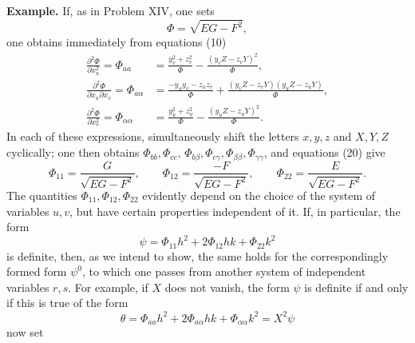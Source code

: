 \documentclass[11pt,a4paper,leqno]{article}
\begin{document}
\textbf{Example.} If, as in Problem XIV, one sets
\[
\Phi=\sqrt{EG-F^2},
\]
one obtains immediately from equations (10)
\[
\begin{aligned}
\frac{\partial^2\Phi}{\partial x_u^2}=\Phi_{aa}
&=\frac{y_v^2+z_v^2}{\Phi}
-\frac{(y_vZ-z_vY)^2}{\Phi},\\
\frac{\partial^2\Phi}{\partial x_u\partial x_v}=\Phi_{a\alpha}
&=\frac{-y_uy_v-z_uz_v}{\Phi}
+\frac{(y_vZ-z_vY)(y_uZ-z_uY)}{\Phi},\\
\frac{\partial^2\Phi}{\partial x_v^2}=\Phi_{\alpha\alpha}
&=\frac{y_u^2+z_u^2}{\Phi}
-\frac{(y_uZ-z_uY)^2}{\Phi}.
\end{aligned}
\]
In each of these expressions, simultaneously shift the letters $x,y,z$
and $X,Y,Z$ cyclically; one then obtains $\Phi_{bb},\Phi_{cc}$,
$\Phi_{b\beta},\Phi_{c\gamma},\Phi_{\beta\beta},\Phi_{\gamma\gamma}$, and equations (20) give
\[
\Phi_{11}=\frac{G}{\sqrt{EG-F^2}},\qquad
\Phi_{12}=\frac{-F}{\sqrt{EG-F^2}},\qquad
\Phi_{22}=\frac{E}{\sqrt{EG-F^2}}.
\]
The quantities $\Phi_{11},\Phi_{12},\Phi_{22}$ evidently depend on the choice
of the system of variables $u,v$, but have certain properties independent
of it. If, in particular, the form
\[
\psi=\Phi_{11}h^2+2\Phi_{12}hk+\Phi_{22}k^2
\]
is definite, then, as we intend to show, the same holds for the correspondingly
formed form $\psi^0$, to which one passes from another
system of independent variables $r,s$. For example, if $X$ does not vanish,
the form $\psi$ is definite if and only if this is true of the form
\[
\theta=\Phi_{aa}h^2+2\Phi_{a\alpha}hk+\Phi_{\alpha\alpha}k^2=X^2\psi
\]
now set
\end{document}

